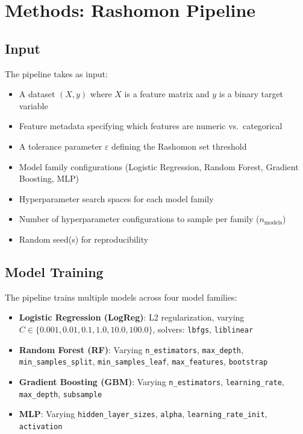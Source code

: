 \section{Methods: Rashomon Pipeline}

\subsection{Input}

The pipeline takes as input:
\begin{itemize}
    \item A dataset $(X, y)$ where $X$ is a feature matrix and $y$ is a binary target variable
    \item Feature metadata specifying which features are numeric vs.\ categorical
    \item A tolerance parameter $\varepsilon$ defining the Rashomon set threshold
    \item Model family configurations (Logistic Regression, Random Forest, Gradient Boosting, MLP)
    \item Hyperparameter search spaces for each model family
    \item Number of hyperparameter configurations to sample per family ($n_{\text{models}}$)
    \item Random seed(s) for reproducibility
\end{itemize}

\subsection{Model Training}

The pipeline trains multiple models across four model families:
\begin{itemize}
    \item \textbf{Logistic Regression (LogReg)}: L2 regularization, varying $C \in \{0.001, 0.01, 0.1, 1.0, 10.0, 100.0\}$, solvers: \texttt{lbfgs}, \texttt{liblinear}
    \item \textbf{Random Forest (RF)}: Varying \texttt{n\_estimators}, \texttt{max\_depth}, \texttt{min\_samples\_split}, \texttt{min\_samples\_leaf}, \texttt{max\_features}, \texttt{bootstrap}
    \item \textbf{Gradient Boosting (GBM)}: Varying \texttt{n\_estimators}, \texttt{learning\_rate}, \texttt{max\_depth}, \texttt{subsample}
    \item \textbf{MLP}: Varying \texttt{hidden\_layer\_sizes}, \texttt{alpha}, \texttt{learning\_rate\_init}, \texttt{activation}
\end{itemize}

